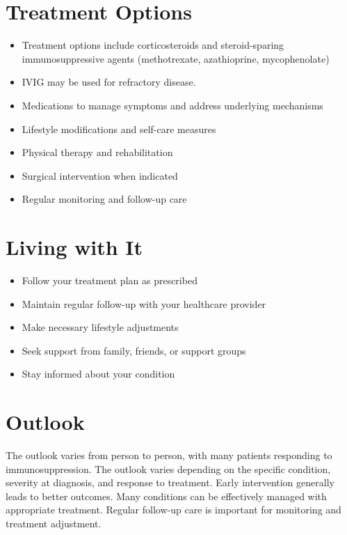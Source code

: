 \section{Treatment Options}
\begin{itemize}[noitemsep]
  \item Treatment options include corticosteroids and steroid-sparing immunosuppressive agents (methotrexate, azathioprine, mycophenolate)
  \item IVIG may be used for refractory disease.
  \item Medications to manage symptoms and address underlying mechanisms
  \item Lifestyle modifications and self-care measures
  \item Physical therapy and rehabilitation
  \item Surgical intervention when indicated
  \item Regular monitoring and follow-up care
\end{itemize}
\section{Living with It}
\begin{itemize}[noitemsep]
  \item Follow your treatment plan as prescribed
  \item Maintain regular follow-up with your healthcare provider
  \item Make necessary lifestyle adjustments
  \item Seek support from family, friends, or support groups
  \item Stay informed about your condition
\end{itemize}
\section{Outlook}
The outlook varies from person to person, with many patients responding to immunosuppression. The outlook varies depending on the specific condition, severity at diagnosis, and response to treatment. Early intervention generally leads to better outcomes. Many conditions can be effectively managed with appropriate treatment. Regular follow-up care is important for monitoring and treatment adjustment.
